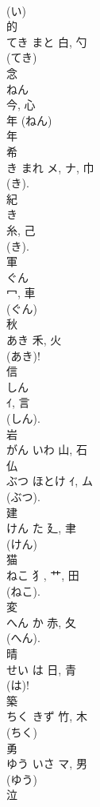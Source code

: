 \documentclass[8pt]{extreport}
\begin{document}
\begin{CJK}{UTF8}{min}
\\	(い) 
\\	的	
\\	てき	まと	白, 勺	
\\	(てき) 
\\	念	
\\	ねん	
\\	今, 心	
\\	年 (ねん) 
\\	年 
\\	希	
\\	き	まれ	メ, ナ, 巾	
\\	(き). 
\\	紀	
\\	き	
\\	糸, 己	
\\	(き). 
\\	軍	
\\	ぐん	
\\	冖, 車	
\\	(ぐん) 
\\	秋	
\\	あき	禾, 火	
\\	(あき)!
\\	信	
\\	しん	
\\	ｲ, 言	
\\	(しん). 
\\	岩	
\\	がん	いわ	山, 石	
\\	仏	
\\	ぶつ	ほとけ	ｲ, ム	
\\	(ぶつ). 
\\	建	
\\	けん	た	廴, 聿	
\\	(けん) 
\\	猫	
\\	ねこ	犭, 艹, 田	
\\	(ねこ). 
\\	変	
\\	へん	か	赤, 夂	
\\	(へん). 
\\	晴	
\\	せい	は	日, 青	
\\	(は)! 
\\	築	
\\	ちく	きず	竹, 木		
\\	(ちく) 
\\	勇	
\\	ゆう	いさ	マ, 男	
\\	(ゆう) 
\\	泣	

\end{CJK}
\end{document}
